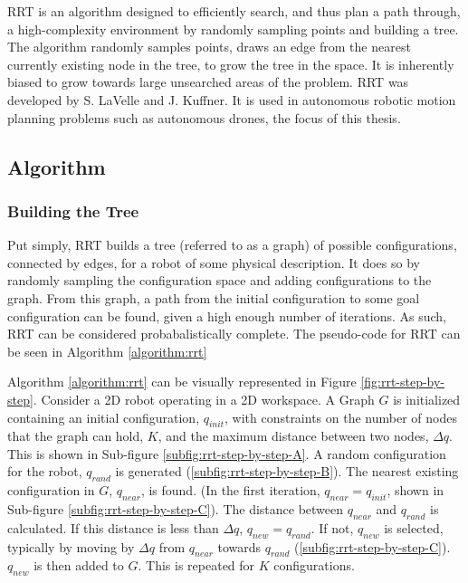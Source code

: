 
\ac{RRT} is an algorithm designed to efficiently search, and thus plan a path through, a high-complexity environment by randomly sampling points and building a tree. The algorithm randomly samples points, draws an edge from the nearest currently existing node in the tree, to grow the tree in the space. It is inherently biased to grow towards large unsearched areas of the problem. RRT was developed by S. LaVelle\cite{LaValle1998} and J. Kuffner\cite{LaValle2001}. It is used in autonomous robotic motion planning problems such as autonomous drones, the focus of this thesis.

\subsection{Algorithm}
    
    \subsubsection*{Building the Tree}

        Put simply, \ac{RRT} builds a tree (referred to as a graph) of possible configurations, connected by edges, for a robot of some physical description. It does so by randomly sampling the configuration space and adding configurations to the graph. From this graph, a path from the initial configuration to some goal configuration can be found, given a high enough number of iterations. As such, \ac{RRT} can be considered probabalistically complete.
        The pseudo-code for \ac{RRT} can be seen in Algorithm \ref{algorithm:rrt}
        
        

        Algorithm \ref{algorithm:rrt} can be visually represented in Figure \ref{fig:rrt-step-by-step}. Consider a \ac{2D} robot operating in a \ac{2D} workspace. A Graph $G$ is initialized containing an initial configuration, $q_{init}$, with constraints on the number of nodes that the graph can hold, $K$, and the maximum distance between two nodes, $\Delta q$. This is shown in Sub-figure \ref{subfig:rrt-step-by-step-A}. A random configuration for the robot, $q_{rand}$ is generated (\ref{subfig:rrt-step-by-step-B}). The nearest existing configuration in $G$, $q_{near}$, is found. (In the first iteration, $q_{near} = q_{init}$, shown in Sub-figure \ref{subfig:rrt-step-by-step-C}). The distance between $q_{near}$ and $q_{rand}$ is calculated. If this distance is less than $\Delta q$, $q_{new} = q_{rand}$. If not, $q_{new}$ is selected, typically by moving by $\Delta q$ from $q_{near}$ towards $q_{rand}$ (\ref{subfig:rrt-step-by-step-C}). $q_{new}$ is then added to $G$. This is repeated for $K$ configurations.

